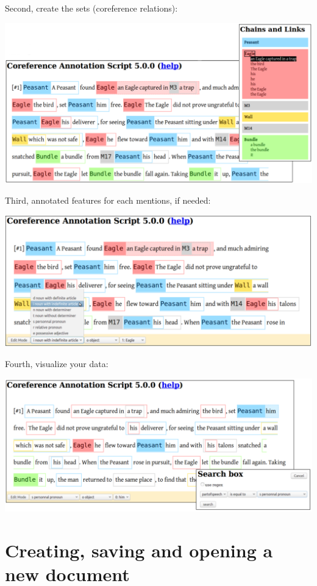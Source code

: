 \documentclass[12pt]{article}
\begin{document}
Second, create the sets (coreference relations):\nopagebreak

\includegraphics[width=15cm]{imgs/workflow2.png}

Third, annotated features for each mentions, if needed:\nopagebreak

\includegraphics[width=15cm]{imgs/workflow3.png}

Fourth, visualize your data:\nopagebreak

\includegraphics[width=15cm]{imgs/workflow4.png}


 \section{Creating, saving and opening a new document}
\end{document}
